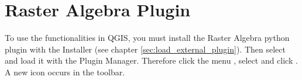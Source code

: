 
\section{Raster Algebra Plugin}\label{sec:raster_algebra}



To use the functionalities in QGIS, you must install the Raster Algebra 
python plugin with the  Installer 
(see chapter \ref{sec:load_external_plugin}). Then select and load it 
with the Plugin Manager. Therefore click the menu  
\arrow {}, select  
and click . A new  
icon occurs in the toolbar.

